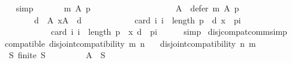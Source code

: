 \begin{isabellebody}
\ \ \ \ \isamarkupfalse%
\ simp\isanewline
\ \ \isamarkupfalse%
\isanewline
\ \ \ \ {\isachardoublequoteopen}m\ A\ p\ {\isacharequal}{\kern0pt}\isanewline
\ \ \ \ \ \ \ \ {\isacharparenleft}{\kern0pt}{\isacharbraceleft}{\kern0pt}{\isacharbraceright}{\kern0pt}{\isacharcomma}{\kern0pt}\isanewline
\ \ \ \ \ \ \ \ \ \ A\ {\isacharminus}{\kern0pt}\ defer\ m\ A\ p{\isacharcomma}{\kern0pt}\isanewline
\ \ \ \ \ \ \ \ \ \ {\isacharbraceleft}{\kern0pt}d\ {\isasymin}\ A{\isachardot}{\kern0pt}\ {\isasymforall}x{\isasymin}A\ {\isacharminus}{\kern0pt}\ {\isacharbraceleft}{\kern0pt}d{\isacharbraceright}{\kern0pt}{\isachardot}{\kern0pt}\isanewline
\ \ \ \ \ \ \ \ \ \ \ \ card\ {\isacharbraceleft}{\kern0pt}i{\isachardot}{\kern0pt}\ i\ {\isacharless}{\kern0pt}\ length\ p\ {\isasymand}\ {\isacharparenleft}{\kern0pt}d{\isacharcomma}{\kern0pt}\ x{\isacharparenright}{\kern0pt}\ {\isasymin}\ {\isacharparenleft}{\kern0pt}p{\isacharbang}{\kern0pt}i{\isacharparenright}{\kern0pt}{\isacharbraceright}{\kern0pt}\ {\isacharless}{\kern0pt}\isanewline
\ \ \ \ \ \ \ \ \ \ \ \ \ \ card\ {\isacharbraceleft}{\kern0pt}i{\isachardot}{\kern0pt}\ i\ {\isacharless}{\kern0pt}\ length\ p\ {\isasymand}\ {\isacharparenleft}{\kern0pt}x{\isacharcomma}{\kern0pt}\ d{\isacharparenright}{\kern0pt}\ {\isasymin}\ {\isacharparenleft}{\kern0pt}p{\isacharbang}{\kern0pt}i{\isacharparenright}{\kern0pt}{\isacharbraceright}{\kern0pt}{\isacharbraceright}{\kern0pt}{\isacharparenright}{\kern0pt}{\isachardoublequoteclose}\isanewline
\ \ \ \ \isamarkupfalse%
\ simp\isanewline
{}\isamarkupfalse%
%
\endisatagproof
{\isafoldproof}%
%
\isadelimproof
\isanewline
%
\endisadelimproof
\isanewline
\isanewline
{}\isamarkupfalse%
\ disj{\isacharunderscore}{\kern0pt}compat{\isacharunderscore}{\kern0pt}comm{\isacharbrackleft}{\kern0pt}simp{\isacharbrackright}{\kern0pt}{\isacharcolon}{\kern0pt}\isanewline
\ \ \ compatible{\isacharcolon}{\kern0pt}\ {\isachardoublequoteopen}disjoint{\isacharunderscore}{\kern0pt}compatibility\ m\ n{\isachardoublequoteclose}\isanewline
\ \ \ {\isachardoublequoteopen}disjoint{\isacharunderscore}{\kern0pt}compatibility\ n\ m{\isachardoublequoteclose}\isanewline
%
\isadelimproof
%
\endisadelimproof
%
\isatagproof
{}\isamarkupfalse%
\ {\isacharminus}{\kern0pt}\isanewline
\ \ \isamarkupfalse%
\isanewline
\ \ \ \ {\isachardoublequoteopen}{\isasymforall}S{\isachardot}{\kern0pt}\ finite\ S\ {\isasymlongrightarrow}\isanewline
\ \ \ \ \ \ \ \ {\isacharparenleft}{\kern0pt}{\isasymexists}A\ {\isasymsubseteq}\ S{\isachardot}{\kern0pt}\isanewline

\end{isabellebody}
